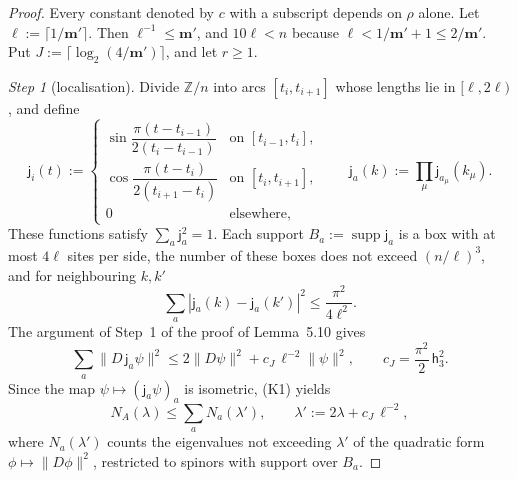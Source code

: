 \documentclass[11pt,letterpaper,reqno]{amsart}
\theoremstyle{definition}
\begin{document}
\begin{proof}
Every constant denoted by $c$ with a subscript depends on $\rho$ alone.
Let $\ell:=\lceil1/\mathbf m'\rceil$.
Then $\ell^{-1}\le\mathbf m'$, and $10\ell<n$ because $\ell<1/\mathbf m'+1\le2/\mathbf m'$.
Put $J:=\lceil\log_2(4/\mathbf m')\rceil$, and let $r\ge1$.

\emph{Step 1} (localisation).
Divide $\mathbb Z/n$ into arcs $[t_i,t_{i+1}]$ whose lengths lie in $[\ell,2\ell)$, and define
\begin{equation*}
\mathsf j_i(t):=\begin{cases}\sin\dfrac{\pi(t-t_{i-1})}{2(t_i-t_{i-1})}&\text{on }[t_{i-1},t_i],\\[2mm]\cos\dfrac{\pi(t-t_i)}{2(t_{i+1}-t_i)}&\text{on }[t_i,t_{i+1}],\\[1mm]0&\text{elsewhere,}\end{cases}\qquad\mathsf j_a(k):=\prod_\mu\mathsf j_{a_\mu}(k_\mu).
\end{equation*}
These functions satisfy $\sum_a\mathsf j_a^2=1$.
Each support $B_a:=\operatorname{supp}\mathsf j_a$ is a box with at most $4\ell$ sites per side, the number of these boxes does not exceed $(n/\ell)^3$, and for neighbouring $k,k'$
\begin{equation*}
\sum_a|\mathsf j_a(k)-\mathsf j_a(k')|^2\le\frac{\pi^2}{4\ell^2}.
\end{equation*}
The argument of Step~1 of the proof of Lemma~5.10 gives
\begin{equation*}
\sum_a\|D\,\mathsf j_a\psi\|^2\le2\|D\psi\|^2+c_J\,\ell^{-2}\|\psi\|^2,\qquad c_J=\frac{\pi^2}{2}\,\mathsf h_3^2.
\end{equation*}
Since the map $\psi\mapsto(\mathsf j_a\psi)_a$ is isometric, (K1) yields
\begin{equation*}
N_A(\lambda)\le\sum_aN_a(\lambda'),\qquad\lambda':=2\lambda+c_J\,\ell^{-2},
\end{equation*}
where $N_a(\lambda')$ counts the eigenvalues not exceeding $\lambda'$ of the quadratic form $\phi\mapsto\|D\phi\|^2$, restricted to spinors with support over $B_a$.


\end{proof}
\end{document}

